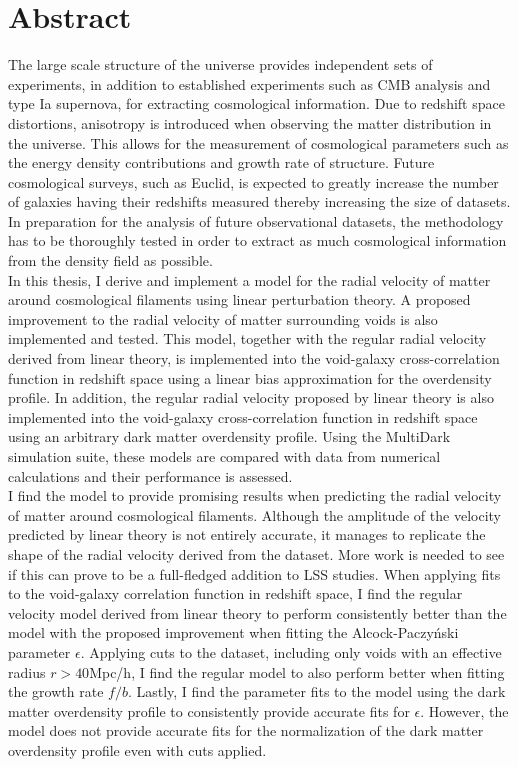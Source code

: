 \chapter*{Abstract}
The large scale structure of the universe provides independent sets of experiments, in addition to established experiments such as CMB analysis and type Ia supernova, for extracting cosmological information. Due to redshift space distortions, anisotropy is introduced when observing the matter distribution in the universe. This allows for the measurement of cosmological parameters such as the energy density contributions and growth rate of structure.
Future cosmological surveys, such as Euclid, is expected to greatly increase the number of galaxies having their redshifts measured thereby increasing the size of datasets. In preparation for the analysis of future observational datasets, the methodology has to be thoroughly tested in order to extract as much cosmological information from the density field as possible.\\\indent
In this thesis, I derive and implement a model for the radial velocity of matter around cosmological filaments using linear perturbation theory. A proposed improvement to the radial velocity of matter surrounding voids is also implemented and tested. This model, together with the regular radial velocity derived from linear theory, is implemented into the void-galaxy cross-correlation function in redshift space using a linear bias approximation for the overdensity profile. In addition, the regular radial velocity proposed by linear theory is also implemented into the void-galaxy cross-correlation function in redshift space using an arbitrary dark matter overdensity profile. Using the MultiDark simulation suite, these models are compared with data from numerical calculations and their performance is assessed.  
\\\indent
I find the model to provide promising results when predicting the radial velocity of matter around cosmological filaments. Although the amplitude of the velocity predicted by linear theory is not entirely accurate, it manages to replicate the shape of the radial velocity derived from the dataset. More work is needed to see if this can prove to be a full-fledged addition to LSS studies. When applying fits to the void-galaxy correlation function in redshift space, I find the regular velocity model derived from linear theory to perform consistently better than the model with the proposed improvement when fitting the Alcock-Paczyński parameter $\epsilon$. Applying cuts to the dataset, including only voids with an effective radius $r>40$Mpc/h, I find the regular model to also perform better when fitting the growth rate $f/b$. Lastly, I find the parameter fits to the model using the dark matter overdensity profile to consistently provide accurate fits for $\epsilon$. However, the model does not provide accurate fits for the normalization of the dark matter overdensity profile even with cuts applied.
\\\indent